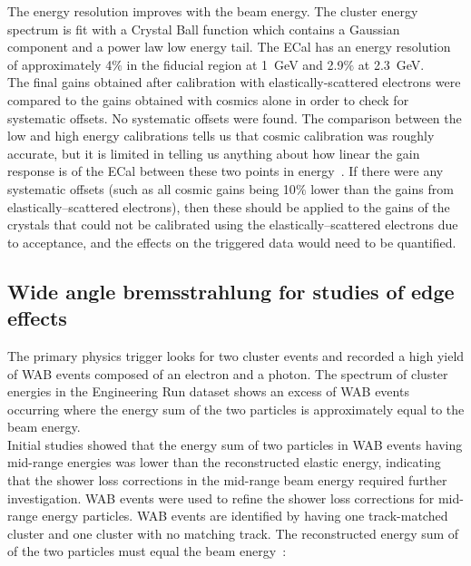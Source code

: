 The energy resolution improves with the beam energy. The cluster energy spectrum is fit with a Crystal Ball function which contains a Gaussian component and a power law low energy tail. The ECal has an energy resolution of approximately 4$\%$ in the fiducial region at 1~GeV and 2.9$\%$ at 2.3~GeV. \\
\indent The final gains obtained after calibration with elastically-scattered electrons were compared to the gains obtained with cosmics alone in order to check for systematic offsets. No systematic offsets were found. The comparison between the low and high energy calibrations tells us that cosmic calibration was roughly accurate, but it is limited in telling us anything about how linear the gain response is of the ECal between these two points in energy~\cite{szumila-vance_hps_2016}. If there were any systematic offsets (such as all cosmic gains being 10$\%$ lower than the gains from elastically--scattered electrons), then these should be applied to the gains of the crystals that could not be calibrated using the elastically--scattered electrons due to acceptance, and the effects on the triggered data would need to be quantified. 


\subsection{Wide angle bremsstrahlung for studies of edge effects}
The primary physics trigger looks for two cluster events and recorded a high yield of WAB events composed of an electron and a photon. The spectrum of cluster energies in the Engineering Run dataset shows an excess of WAB events occurring where the energy sum of the two particles is approximately equal to the beam energy.  \\
\indent Initial studies showed that the energy sum of two particles in WAB events having mid-range energies was lower than the reconstructed elastic energy, indicating that the shower loss corrections in the mid-range beam energy required further investigation. WAB events were used to refine the shower loss corrections for mid-range energy particles. WAB events are identified by having one track-matched cluster and one cluster with no matching track. The reconstructed energy sum of of the two particles must equal the beam energy~\cite{szumila-vance_hps_2016}:


